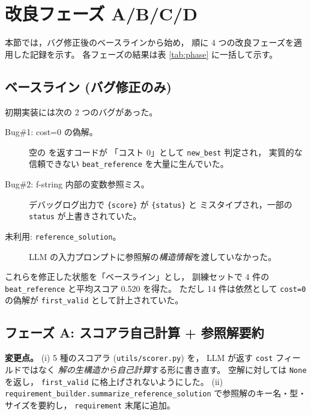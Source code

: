 \documentclass[uplatex,dvipdfmx,a4paper,11pt]{jsarticle}
\begin{document}
\section{改良フェーズ A/B/C/D}\label{sec:phase}

本節では，バグ修正後のベースラインから始め，
順に 4 つの改良フェーズを適用した記録を示す。
各フェーズの結果は表 \ref{tab:phase} に一括して示す。

\subsection{ベースライン (バグ修正のみ)}

初期実装には次の 2 つのバグがあった。

\begin{description}
  \item[Bug\#1: cost=0 の偽解。] 空の \texttt{{}} を返すコードが
    「コスト 0」として \texttt{new\_best} 判定され，
    実質的な信頼できない \texttt{beat\_reference} を大量に生んでいた。
  \item[Bug\#2: f-string 内部の変数参照ミス。]
    デバッグログ出力で \texttt{\{score\}} が \texttt{\{status\}} と
    ミスタイプされ，一部の \texttt{status} が上書きされていた。
  \item[未利用: \texttt{reference\_solution}。]
    LLM の入力プロンプトに参照解の\emph{構造情報}を渡していなかった。
\end{description}

これらを修正した状態を「ベースライン」とし，
訓練セットで 4 件の \texttt{beat\_reference} と平均スコア 0.520 を得た。
ただし 14 件は依然として \texttt{cost=0} の偽解が
\texttt{first\_valid} として計上されていた。

\subsection{フェーズ A: スコアラ自己計算 + 参照解要約}

\textbf{変更点。}
(i) 5 種のスコアラ (\texttt{utils/scorer.py}) を，
LLM が返す \texttt{cost} フィールドではなく
\emph{解の生構造から自己計算}する形に書き直す。
空解に対しては \texttt{None} を返し，
\texttt{first\_valid} に格上げされないようにした。
(ii) \texttt{requirement\_builder.summarize\_reference\_solution}
で参照解のキー名・型・サイズを要約し，
\texttt{requirement} 末尾に追加。
\end{document}
